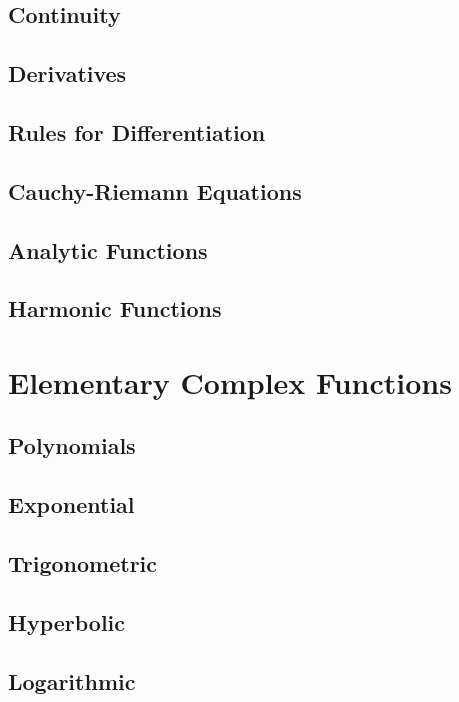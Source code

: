 \subsection{Continuity}

\subsection{Derivatives}

\subsection{Rules for Differentiation}

\subsection{Cauchy-Riemann Equations}

\subsection{Analytic Functions}

\subsection{Harmonic Functions}

\newpage
\section{Elementary Complex Functions}

\subsection{Polynomials}

\subsection{Exponential}

\subsection{Trigonometric}

\subsection{Hyperbolic}

\subsection{Logarithmic}

